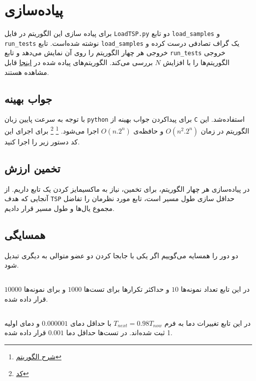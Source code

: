 \chapter{پیاده‌سازی }
برای پیاده سازی این الگوریتم در فایل
\verb;LoadTSP.py;
دو تابع
\verb;load_samples;
و
\verb;run_tests;
نوشته شده‌است.
تابع
\verb;load_samples;
یک گراف تصادفی درست کرده و خروجی هر چهار الگوریتم را روی آن نمایش می‌دهد و تابع
\verb;run_tests;
خروجی الگوریتم‌‌ها را با افزایش
$N$
بررسی می‌کند.
الگوریتم‌های پیاده شده در 
\href{https://github.com/atrin-hojjat/Uni-AI-Course-Reports/blob/main/Report\%2003/code/TSP/}{اینجا}
قابل مشاهده هستند.

\section{جواب بهینه}

با توجه به سرعت پایین زبان
\verb;python;
برای پیداکردن جواب بهینه از
\verb;C;
استفاده‌شد.
این الگوریتم در زمان
$O(n^2 . 2^n)$
و حافظه‌ی
$O(n.2^n)$
اجرا می‌شود.
\footnote{\href{https://www.geeksforgeeks.org/travelling-salesman-problem-set-1/}{شرح الگوریتم}}
\footnote{\href{https://github.com/atrin-hojjat/Uni-AI-Course-Reports/blob/main/Report\%2003/code/tests/efficient_solvers/tsp.c}{کد}}
برای اجرای این کد دستور زیر را اجرا کنید.



\section{تخمین ارزش}
در پیاده‌سازی هر چهار الگوریتم، برای تخمین، نیاز به ماکسیمایز کردن یک تابع داریم. از آنجایی که هدف 
\verb;TSP;
حداقل سازی طول مسیر است، تابع مورد نظرمان را تفاضل مجموع یال‌ها و طول مسیر قرار دادیم.

\section{همسایگی}
دو دور را همسایه می‌گوییم اگر  یکی با جابجا کردن دو عضو متوالی به دیگری تبدیل شود.

\section{}
در این تابع تعداد نمونه‌ها 
$10$
و  حداکثر تکرار‌ها برای تست‌ها
$1000$
و برای نمونه‌ها
$10000$
قرار داده شده.
\section{}
در این تابع 
تغییرات دما به فرم 
$T_{next}=0.98 T_{now}$
با حداقل دمای  $0.000001$ و دمای اولیه 1 ثبت شده‌اند.
در تست‌ها حداقل دما 
$0.001$
قرار داده شده.

